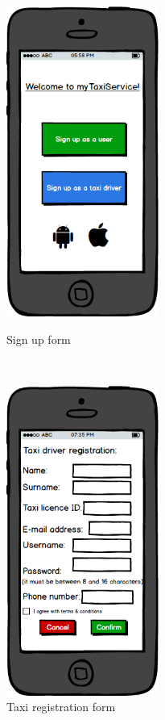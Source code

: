\begin{figure}[H]
    \begin{minipage}[b]{6cm}
        \centering
        \includegraphics[width=5cm]{./Mockups/SignUp.png}
        \caption{Sign up form}
    \end{minipage}
    \ \hspace{2mm} \hspace{3mm} \
    \begin{minipage}[b]{6cm}
        \centering
        \includegraphics[width=5cm]{./Mockups/TaxiRegistration.png}
        \caption{Taxi registration form}
    \end{minipage}
\end{figure}

